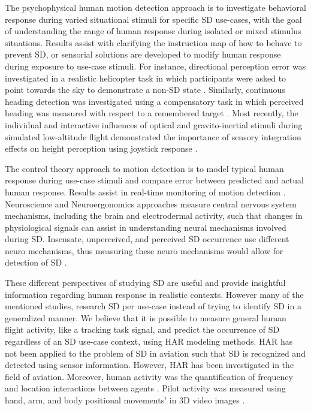 \documentclass{ieeeaccess}
\begin{document}
The psychophysical human motion detection approach is to investigate behavioral response during varied situational stimuli for specific SD use-cases, with the goal of understanding the range of human response during isolated or mixed stimulus situations. Results assist with clarifying the instruction map of how to behave to prevent SD, or sensorial solutions are developed to modify human response during exposure to use-case stimuli. For instance, directional perception error was investigated in a realistic helicopter task in which participants were asked to point towards the sky to demonstrate a non-SD state \cite{Cheung_2000_Disorientation}. Similarly, continuous heading detection was investigated using a compensatory task in which perceived heading was measured with respect to a remembered target \cite{Sargent_2008_Disorientation}. Most recently, the individual and interactive influences of optical and gravito-inertial stimuli during simulated low-altitude flight demonstrated the importance of sensory integration effects on height perception using joystick response \cite{Denquin_2021_LAF}. 

The control theory approach to motion detection is to model typical human response during use-case stimuli and compare error between predicted and actual human response. Results assist in real-time monitoring of motion detection \cite{Soyka_2011_Predicting}. Neuroscience and Neuroergonomics approaches measure central nervous system mechanisms, including the brain and electrodermal activity, such that changes in physiological signals can assist in understanding neural mechanisms involved during SD. Insensate, unperceived, and perceived SD occurrence use different neuro mechanisms, thus measuring these neuro mechanisms would allow for detection of SD \cite{Hao_2020_Classification}. 

These different perspectives of studying SD are useful and provide insightful information regarding human response in realistic contexts. However many of the mentioned studies, research SD per use-case instead of trying to identify SD in a generalized manner. We believe that it is possible to measure general human flight activity, like a tracking task signal, and predict the occurrence of SD regardless of an SD use-case context, using HAR modeling methods. HAR has not been applied to the problem of SD in aviation such that SD is recognized and detected using sensor information. However, HAR has been investigated in the field of aviation. Moreover, human activity was the quantification of frequency and location interactions between agents \cite{Fusier_2007_ComplxexActivity}. Pilot activity was measured using hand, arm, and body positional movements' in 3D video images \cite{Ding_2015_Surveillance}.
\end{document}
